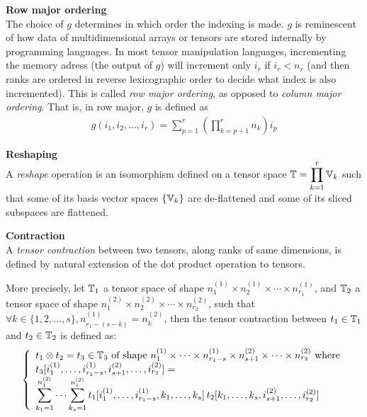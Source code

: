 \begin{remark}\textbf{Row major ordering}\\
The choice of $g$ determines in which order the indexing is made. $g$ is reminescent of how data of multidimensional arrays or tensors are stored internally by programming languages. In most tensor manipulation languages, incrementing the memory adress (\ie the output of $g$) will increment only $i_r$ if $i_r < n_r$ (and then ranks are ordered in reverse lexicographic order to decide what index is also incremented). This is called \emph{row major ordering}, as opposed to \emph{column major ordering}. That is, in row major, $g$ is defined as
\begin{align}
  g(i_1, i_2, \ldots, i_r) = \displaystyle \sum_{p=1}^r \left( \prod_{k=p+1}^r n_k \right) i_p \label{rowmajor}
\end{align}
\end{remark}

\begin{definition}\textbf{Reshaping}\\
A \emph{reshape} operation is an isomorphism defined on a tensor space $\mathbb{T} = \displaystyle \prod_{k=1}^r \mathbb{V}_k$ such that some of its basis vector spaces $\{\mathbb{V}_k\}$ are de-flattened and some of its sliced subspaces are flattened.
\end{definition}

\begin{definition}\textbf{Contraction}\\
A \emph{tensor contraction} between two tensors, along ranks of same dimensions, is defined by natural extension of the dot product operation to tensors.

More precisely, let $\mathbb{T}_1$ a tensor space of shape $n_1^{(1)} \times n_2^{(1)} \times \cdots \times n_{r_1}^{(1)}$, and $\mathbb{T}_2$ a tensor space of shape $n_1^{(2)} \times n_2^{(2)} \times \cdots \times n_{r_2}^{(2)}$, such that $\forall k \in \{1, 2, \ldots, s\}, n_{r_1-(s-k)}^{(1)} = n_k^{(2)}$, then the tensor contraction between $t_1 \in \mathbb{T}_1$ and $t_2 \in \mathbb{T}_2$ is defined as:
\begin{gather*}
\left\{
  \begin{array}{l}
    t_1 \otimes t_2 = t_3 \in \mathbb{T}_3 \text{ of shape } n_1^{(1)} \times \cdots \times n_{r_1-s}^{(1)} \times n_{s+1}^{(2)} \times \cdots \times n_{r_2}^{(2)}
    \text{ where} \\
    t_3[i_1^{(1)}, \ldots, i_{r_1-s}^{(1)}, i_{s+1}^{(2)}, \ldots, i_{r_2}^{(2)}] = \\
    \displaystyle \sum_{k_1=1}^{n_1^{(2)}} \cdots \sum_{k_s=1}^{n_s^{(2)}}
    t_1[i_1^{(1)}, \ldots, i_{r_1-s}^{(1)}, k_1, \ldots, k_s] \hspace{2pt}
    t_2[k_1, \ldots, k_s, i_{s+1}^{(2)}, \ldots, i_{r_2}^{(2)}]
  \end{array}
\right.
\end{gather*}
\end{definition}

